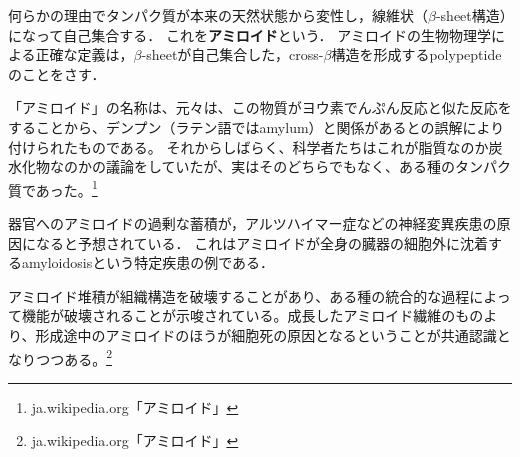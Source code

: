 \documentclass[uplatex, dvipdfmx]{jsreport}
\begin{document}
\begin{definition}
    何らかの理由でタンパク質が本来の天然状態から変性し，線維状（$\beta$-sheet構造）になって自己集合する．
    これを\textbf{アミロイド}という．
    アミロイドの生物物理学による正確な定義は，$\beta$-sheetが自己集合した，cross-$\beta$構造を形成するpolypeptideのことをさす．
\end{definition}
\begin{remark}
    「アミロイド」の名称は、元々は、この物質がヨウ素でんぷん反応と似た反応をすることから、デンプン（ラテン語ではamylum）と関係があるとの誤解により付けられたものである。
    それからしばらく、科学者たちはこれが脂質なのか炭水化物なのかの議論をしていたが、実はそのどちらでもなく、ある種のタンパク質であった。\footnote{ja.wikipedia.org「アミロイド」}
\end{remark}
\begin{remark}[組織病理学]
    器官へのアミロイドの過剰な蓄積が，アルツハイマー症などの神経変異疾患の原因になると予想されている．
    これはアミロイドが全身の臓器の細胞外に沈着するamyloidosisという特定疾患の例である．

    アミロイド堆積が組織構造を破壊することがあり、ある種の統合的な過程によって機能が破壊されることが示唆されている。成長したアミロイド繊維のものより、形成途中のアミロイドのほうが細胞死の原因となるということが共通認識となりつつある。\footnote{ja.wikipedia.org「アミロイド」}
\end{remark}
\end{document}
